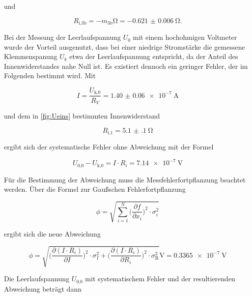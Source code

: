   und

  \begin{equation}
    R_\text{i,3b} = -m_\text{3b} \si{\ohm} = \SI{-0.621(6)}{\ohm}.
  \end{equation}

  \newpage

  Bei der Messung der Leerlaufspannung $U_0$ mit einem hochohmigen Voltmeter
  wurde der Vorteil ausgenutzt, dass bei einer niedrige Stromstärke die
  gemessene Klemmenspanung $U_k$ etwa der Leerlaufspannung entspricht, da
  der Anteil des Innenwiderstandes nahe Null ist.
  Es existiert dennoch ein geringer Fehler, der im Folgenden bestimmt wird.
  Mit

  \begin{equation}
    I = \frac{U_\text{k,0}}{R_V} = \SI{1.40(6)e-7}{\A}
  \end{equation}

  und dem in \ref{fig:Ueins} bestimmten Innenwiderstand

  \begin{equation}
    R_\text{i,1} = \SI{5.1(1)}{\ohm}
  \end{equation}

  ergibt sich der systematische Fehler ohne Abweichung mit der Formel

  \begin{equation}
    U_\text{0,0} - U_\text{k,0} = I \cdot R_i = \SI{7.14e-7}{\V}
  \end{equation}

  Für die Bestimmung der Abweichung muss die Messfehlerfortpflanzung
  beachtet werden. Über die Formel zur Gaußschen Fehlerfortpflanzung

  \begin{equation}
    \phi = \sqrt{\sum_{i=1}^{N} \biggl(\frac{\partial f}{\partial x_i}\biggr)^2
    \cdot \sigma_i^2}
  \end{equation}

  ergibt sich die neue Abweichung

  \begin{equation}
    \phi = \sqrt{\biggl(\frac{\partial(I \cdot R_i)}{\partial I}\biggr)^2
    \cdot \sigma_I^2
    + \biggl(\frac{\partial(I \cdot R_i)}{\partial R_i}\biggr)^2 \cdot
    \sigma_\text{R}^2} \si{\V}
    = \SI{0.3365e-7}{\V}
  \end{equation}

  Die Leerlaufspannung $U_\text{0,0}$ mit systematischem Fehler und der
  resultierenden Abweichung beträgt dann

